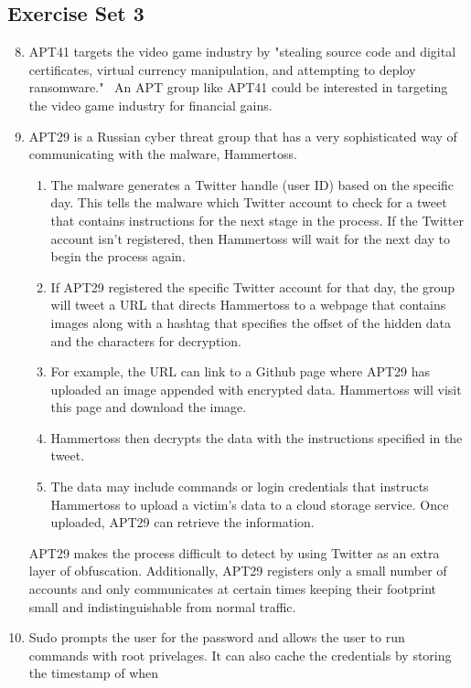 \documentclass[11pt]{article}
\begin{document}
\subsection*{Exercise Set 3}
\begin{enumerate}
  \setcounter{enumi}{7}
  \item APT41 targets the video game industry by "stealing source code and digital
  certificates, virtual currency manipulation, and attempting to deploy ransomware."~\cite{apt41}
  An APT group like APT41 could be interested in targeting the video game industry
  for financial gains.
  \item APT29 is a Russian cyber threat group that has a very sophisticated way of communicating
  with the malware, Hammertoss.~\cite{apt29}
  \begin{enumerate}
    \item The malware generates a Twitter handle (user ID) based on the specific day.
    This tells the malware which Twitter account to check for a tweet that contains
    instructions for the next stage in the process. If the Twitter account isn't registered,
    then Hammertoss will wait for the next day to begin the process again.
    \item If APT29 registered the specific Twitter account for that day, the group
    will tweet a URL that directs Hammertoss to a webpage that contains images along
    with a hashtag that specifies the offset of the hidden data and the characters for decryption.
    \item For example, the URL can link to a Github page where APT29 has uploaded an image
    appended with encrypted data. Hammertoss will visit this page and download the image.
    \item Hammertoss then decrypts the data with the instructions specified in the tweet.
    \item The data may include commands or login credentials that instructs Hammertoss
    to upload a victim's data to a cloud storage service. Once uploaded, APT29 can
    retrieve the information.
  \end{enumerate}
  APT29 makes the process difficult to detect by using Twitter as an extra layer of obfuscation.
  Additionally, APT29 registers only a small number of accounts and only communicates at certain
  times keeping their footprint small and indistinguishable from normal traffic.
  \item Sudo prompts the user for the password and allows the user to run commands with
  root privelages. It can also cache the credentials by storing the timestamp of when

\end{enumerate}
\end{document}
